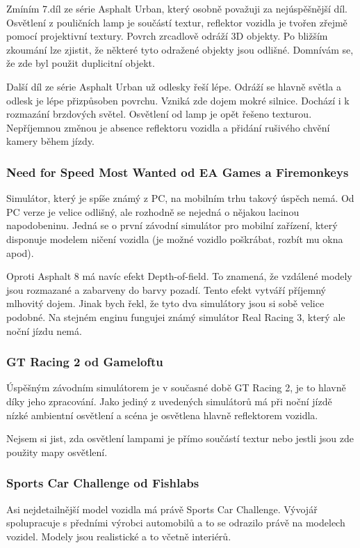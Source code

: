 \documentclass[11pt,twoside,a4paper]{book}
\begin{document}
Zmíním 7.díl ze série Asphalt Urban, který osobně považuji za nejúspěšnější díl. Osvětlení z pouličních lamp je součástí textur, reflektor vozidla je tvořen zřejmě pomocí projektivní textury. Povrch zrcadlově odráží 3D objekty. Po bližším zkoumání lze zjistit, že některé tyto odražené objekty jsou odlišné. Domnívám se, že zde byl použit duplicitní objekt.

Další díl ze série Asphalt Urban už odlesky řeší lépe. Odráží se hlavně světla a odlesk je lépe přizpůsoben povrchu. Vzniká zde dojem mokré silnice. Dochází i k rozmazání brzdových světel. Osvětlení od lamp je opět řešeno texturou. Nepříjemnou změnou je absence reflektoru vozidla a přidání rušivého chvění kamery během jízdy.

\subsubsection{Need for Speed Most Wanted od EA Games a Firemonkeys}
Simulátor, který je spíše známý z PC, na mobilním trhu takový úspěch nemá. Od PC verze je velice odlišný, ale rozhodně se nejedná o nějakou lacinou napodobeninu. Jedná se o první závodní simulátor pro mobilní zařízení, který disponuje modelem ničení vozidla (je možné vozidlo poškrábat, rozbít mu okna apod).

Oproti Asphalt 8 má navíc efekt Depth-of-field. To znamená, že vzdálené modely jsou rozmazané a zabarveny do barvy pozadí. Tento efekt vytváří příjemný mlhovitý dojem. Jinak bych řekl, že tyto dva simulátory jsou si sobě velice podobné. Na stejném enginu funguje\linebreak i známý simulátor Real Racing 3, který ale noční jízdu nemá.

\subsubsection{GT Racing 2 od Gameloftu}
Úspěšným závodním simulátorem je v současné době GT Racing 2, je to hlavně díky jeho zpracování. Jako jediný z uvedených simulátorů má při noční jízdě nízké ambientní osvětlení a scéna je osvětlena hlavně reflektorem vozidla.

Nejsem si jist, zda osvětlení lampami je přímo součástí textur nebo jestli jsou zde použity mapy osvětlení.

\subsubsection{Sports Car Challenge od Fishlabs}
Asi nejdetailnější model vozidla má právě Sports Car Challenge. Vývojář spolupracuje s předními výrobci automobilů a to se odrazilo právě na modelech vozidel. Modely jsou realistické a to včetně interiérů.
\end{document}
